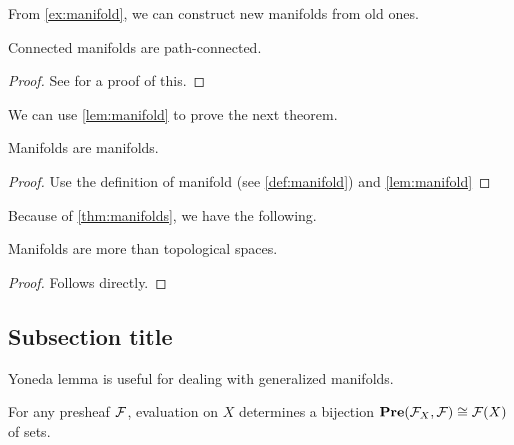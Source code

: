 From \cref{ex:manifold}, we can construct new manifolds from old ones.
\lipsum[1]

\begin{lemma}
    \label{lem:manifold}
    Connected manifolds are path-connected.
\end{lemma}
\begin{proof}
    See \cite{Lee2013} for a proof of this.
\end{proof} 

We can use \cref{lem:manifold} to prove the next theorem.

\begin{thm}
    \label{thm:manifolds}
    Manifolds are manifolds.
\end{thm} 
\begin{proof}
    Use the definition of manifold (see \cref{def:manifold}) and \cref{lem:manifold}
\end{proof}

Because of \cref{thm:manifolds}, we have the following.

\begin{cor}
    Manifolds are more than topological spaces.
\end{cor}
\begin{proof}
    Follows directly.
\end{proof}

\subsection{Subsection title}
Yoneda lemma is useful for dealing with generalized manifolds. 
\lipsum[1]
 
\begin{thm}
    For any presheaf $\mathcal{F}$, evaluation on $X$ determines a bijection $\operatorname{\mathbf{Pre}}(\mathcal{F}_X , \mathcal{F}) \cong \mathcal{F}(X)$ of sets.
\end{thm}  